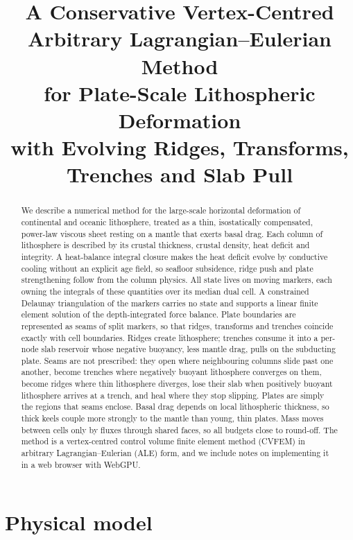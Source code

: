 \documentclass[11pt]{article}
\title{A Conservative Vertex-Centred Arbitrary Lagrangian--Eulerian Method\\
for Plate-Scale Lithospheric Deformation\\
with Evolving Ridges, Transforms, Trenches and Slab Pull}
\author{}
\date{}
\begin{document}
\maketitle

\begin{abstract}
We describe a numerical method for the large-scale horizontal deformation of continental and oceanic lithosphere, treated as a thin, isostatically compensated, power-law viscous sheet resting on a mantle that exerts basal drag. Each column of lithosphere is described by its crustal thickness, crustal density, heat deficit and integrity. A heat-balance integral closure makes the heat deficit evolve by conductive cooling without an explicit age field, so seafloor subsidence, ridge push and plate strengthening follow from the column physics. All state lives on moving markers, each owning the integrals of these quantities over its median dual cell. A constrained Delaunay triangulation of the markers carries no state and supports a linear finite element solution of the depth-integrated force balance. Plate boundaries are represented as seams of split markers, so that ridges, transforms and trenches coincide exactly with cell boundaries. Ridges create lithosphere; trenches consume it into a per-node slab reservoir whose negative buoyancy, less mantle drag, pulls on the subducting plate. Seams are not prescribed: they open where neighbouring columns slide past one another, become trenches where negatively buoyant lithosphere converges on them, become ridges where thin lithosphere diverges, lose their slab when positively buoyant lithosphere arrives at a trench, and heal where they stop slipping. Plates are simply the regions that seams enclose. Basal drag depends on local lithospheric thickness, so thick keels couple more strongly to the mantle than young, thin plates. Mass moves between cells only by fluxes through shared faces, so all budgets close to round-off. The method is a vertex-centred control volume finite element method (CVFEM) in arbitrary Lagrangian--Eulerian (ALE) form, and we include notes on implementing it in a web browser with WebGPU.
\end{abstract}

\tableofcontents

\section{Physical model}
\end{document}
